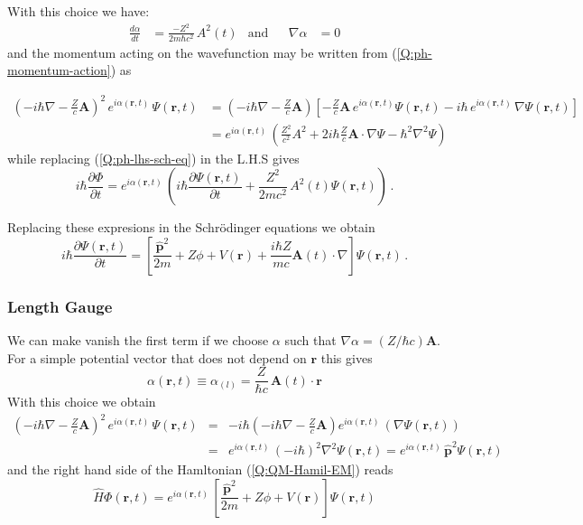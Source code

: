 With this choice we have:
\begin{align}
  \label{Q:ph-alpha-vel-deriv-t}
  \frac{d \alpha}{d t} &= \frac{-Z^{2}}{2 m \hbar c^{2}} \, A^{2}(t)& \text{and} &&  \nabla \alpha &= 0
\end{align}
and the momentum acting on the wavefunction may be written from (\ref{Q:ph-momentum-action}) as

\begin{align*}
  \left( - i \hbar \nabla - \frac{Z}{c}\bm{A} \right)^{2} \, e^{i \alpha(\bm{r},t)} \, \Psi(\bm{r},t) &= \left( - i \hbar \nabla - \frac{Z}{c}\bm{A} \right)\left[ - \frac{Z}{c}\bm{A} \,e^{i \alpha(\bm{r},t)} \Psi(\bm{r},t) - i \hbar \, e^{i \alpha(\bm{r},t)} \, \nabla \Psi(\bm{r},t) \right] \\
&=  e^{i \alpha(\bm{r},t)} \,\left( \frac{Z^{2}}{c^{2}} A^{2} + 2 i \hbar \frac{Z}{c} \bm{A} \cdot \nabla \Psi - \hbar^{2} \nabla^{2} \Psi  \right)
\end{align*}
%
while replacing (\ref{Q:ph-lhs-sch-eq}) in the L.H.S gives
\begin{equation*}
  i \hbar \frac{\partial \Phi}{\partial t} = e^{i \alpha(\bm{r},t)} \, \left( i \hbar \frac{\partial \Psi(\bm{r},t)}{\partial t} + \frac{Z^{2}}{2 m  c^{2}} \, A^{2}(t)  \Psi(\bm{r},t) \right) \,.
\end{equation*}

Replacing these expresions in the Schr\"{o}dinger equations we obtain
\begin{equation}
  \label{Q:ph-schrod-gauge-vel}
    i \hbar \frac{\partial \Psi(\bm{r},t)}{\partial t} = \left[ \frac{\hat{\bm{p}}^{2}}{2m} +  Z \phi +  V(\bm{r}) + \frac{i \hbar Z}{m c} \bm{A}(t) \cdot \nabla \right]  \Psi(\bm{r},t)  \,.
\end{equation}


\subsubsection{Length Gauge}
\label{S:length-gauge}
We can make vanish the first term if we choose $\alpha$ such that $\nabla \alpha = (Z/\hbar c) \bm{A}$. For a simple potential vector that does not depend on $\bm{r}$ this gives
\begin{equation}
\label{Q:ph-alpha-len}  \alpha(\bm{r},t) \equiv \alpha_{(l)}= \frac{Z}{\hbar c}\, \bm{A}(t) \cdot \bm{r}
\end{equation}
%
With this choice we obtain
\begin{eqnarray*}
  \left( - i \hbar \nabla - \frac{Z}{c}\bm{A} \right)^{2}\, e^{i \alpha(\bm{r},t)} \, \Psi(\bm{r},t)&=& -i \hbar \left( - i \hbar \nabla - \frac{Z}{c}\bm{A} \right) e^{i \alpha(\bm{r},t)} \, \left( \nabla \Psi(\bm{r},t) \right) \\ 
&=&  e^{i \alpha(\bm{r},t)} \, (-i \hbar)^{2}  \nabla^{2} \Psi(\bm{r},t) =  e^{i \alpha(\bm{r},t)} \, \hat{\bm{p}}^{2} \Psi(\bm{r},t)
\end{eqnarray*}
and the right hand side of the Hamltonian (\ref{Q:QM-Hamil-EM}) reads
\begin{equation}
  \label{Q:ph-Hamilt-EM-1}
  \hat{H} \Phi(\bm{r},t)=  e^{i \alpha(\bm{r},t)} \,\left[ \frac{\hat{\bm{p}}^{2}}{2m} +  Z \phi + V(\bm{r})\right] \Psi(\bm{r},t)
\end{equation}

